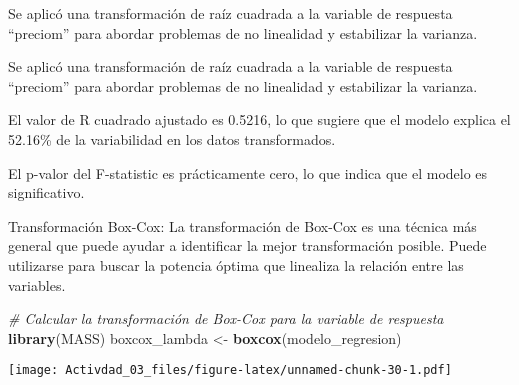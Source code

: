 \documentclass[
]{article}
\newenvironment{Shaded}{\begin{snugshade}}{\end{snugshade}}
\newcommand{\AttributeTok}[1]{\textcolor[rgb]{0.13,0.29,0.53}{#1}}
\newcommand{\CommentTok}[1]{\textcolor[rgb]{0.56,0.35,0.01}{\textit{#1}}}
\newcommand{\DecValTok}[1]{\textcolor[rgb]{0.00,0.00,0.81}{#1}}
\newcommand{\FunctionTok}[1]{\textcolor[rgb]{0.13,0.29,0.53}{\textbf{#1}}}
\newcommand{\NormalTok}[1]{#1}
\newcommand{\OtherTok}[1]{\textcolor[rgb]{0.56,0.35,0.01}{#1}}
\newcommand{\SpecialCharTok}[1]{\textcolor[rgb]{0.81,0.36,0.00}{\textbf{#1}}}
\begin{document}
Se aplicó una transformación de raíz cuadrada a la variable de respuesta
``preciom'' para abordar problemas de no linealidad y estabilizar la
varianza.

Se aplicó una transformación de raíz cuadrada a la variable de respuesta
``preciom'' para abordar problemas de no linealidad y estabilizar la
varianza.

El valor de R cuadrado ajustado es 0.5216, lo que sugiere que el modelo
explica el 52.16\% de la variabilidad en los datos transformados.

El p-valor del F-statistic es prácticamente cero, lo que indica que el
modelo es significativo.

Transformación Box-Cox: La transformación de Box-Cox es una técnica más
general que puede ayudar a identificar la mejor transformación posible.
Puede utilizarse para buscar la potencia óptima que linealiza la
relación entre las variables.

\begin{Shaded}
\begin{Highlighting}[]
\CommentTok{\# Calcular la transformación de Box{-}Cox para la variable de respuesta}
\FunctionTok{library}\NormalTok{(MASS)}
\NormalTok{boxcox\_lambda }\OtherTok{\textless{}{-}} \FunctionTok{boxcox}\NormalTok{(modelo\_regresion)}
\end{Highlighting}
\end{Shaded}

\texttt{[image: Activdad\_03\_files/figure-latex/unnamed-chunk-30-1.pdf]}

\begin{Shaded}
\end{Shaded}
\end{document}
